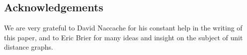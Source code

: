 \documentclass[a4paper,11pt]{article}
\theoremstyle{definition}
\theoremstyle{remark}
\begin{document}
\subsection*{Acknowledgements}
We are very grateful to David Naccache for his constant help in the writing of
this paper, and to Eric Brier for many ideas and insight on the subject of 
unit distance graphs.



\end{document}

